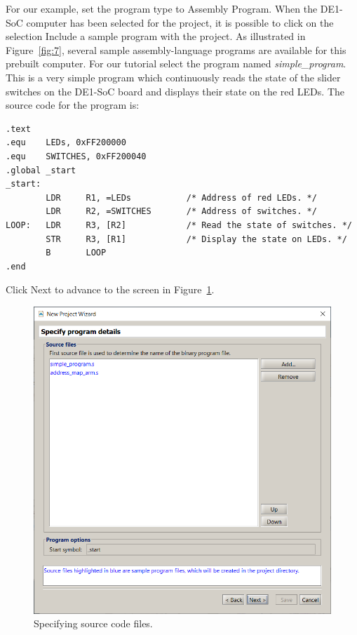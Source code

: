 \documentclass[11pt, twoside, pdftex]{article}
\begin{document}
\begin{enumerate}
For our example, set the program type to {\sf Assembly Program}.
When the DE1-SoC computer has been selected for the project, 
it is possible to click on the
selection {\sf Include a sample program with the project}.  
As illustrated in Figure~\ref{fig:7}, several sample 
assembly-language programs are available for this prebuilt
computer.  For our tutorial select the program named 
{\it simple\_program}. This is a very simple program which
continuously reads the state of the slider switches on the
DE1-SoC board and displays their state on the red LEDs.
The source code for the program is:

\lstset{style=defaultArmStyle}
\begin{center}
\begin{minipage}[t]{16 cm}
\begin{lstlisting}
.text
.equ	LEDs, 0xFF200000
.equ	SWITCHES, 0xFF200040
.global _start
_start:
		LDR		R1, =LEDs			/* Address of red LEDs. */   
		LDR		R2, =SWITCHES		/* Address of switches. */
LOOP:	LDR		R3, [R2]			/* Read the state of switches. */
		STR		R3, [R1]			/* Display the state on LEDs. */
		B		LOOP
.end
\end{lstlisting}
\end{minipage}
\end{center}
Click {\sf Next} to advance to the screen in Figure~\ref{fig:8}.\\

\begin{figure}[H]
   \begin{center} \includegraphics[scale=0.65]{screenshots/figure8.png}
   \end{center}
   \caption{Specifying source code files.}
	 \label{fig:8}
\end{figure}


\end{enumerate}
\end{document}

